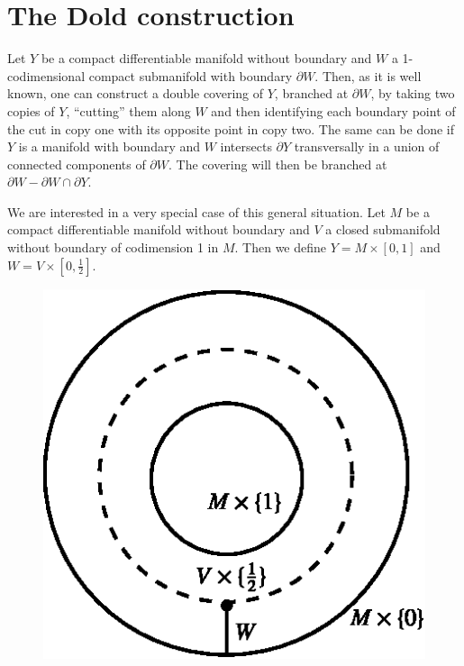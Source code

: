 \section{The Dold construction}\label{art11-sec2}\pageoriginale

Let $Y$ be a compact differentiable manifold without boundary and $W$ a 1-codimensional compact submanifold with boundary $\partial W$. Then, as it is well known, one can construct a double covering of $Y$, branched at $\partial W$, by taking two copies of $Y$, ``cutting'' them along $W$ and then identifying each boundary point of the cut in copy one with its opposite point in copy two. The same can be done if $Y$ is a manifold with boundary and $W$ intersects $\partial Y$ transversally in a union of connected components of $\partial W$. The covering will then be branched at $\partial W-\partial W\cap \partial Y$.

We are interested in a very special case of this general situation. Let $M$ be a compact differentiable manifold without boundary and $V$ a closed submanifold without boundary of codimension 1 in $M$. Then we define $Y=M\times [0,1]$ and $W=V\times [0,\frac{1}{2}]$.
\begin{figure}[H]
\centering
\includegraphics{figures/fig1.eps}
\end{figure}

